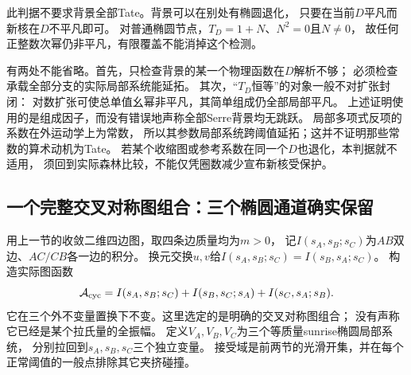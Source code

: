 \documentclass[11pt,a4paper]{ctexart}
\theoremstyle{cnplain}\newtheorem{theorem}{定理}[section]
\theoremstyle{definition}\newtheorem{definition}[theorem]{定义}
\theoremstyle{remark}\newtheorem{remark}[theorem]{注}
\begin{document}
此判据不要求背景全部Tate。背景可以在别处有椭圆退化，
只要在当前$D$平凡而新核在$D$不平凡即可。
对普通椭圆节点，$T_D=1+N$、$N^2=0$且$N\ne0$，
故任何正整数次幂仍非平凡，有限覆盖不能消掉这个检测。

有两处不能省略。首先，只检查背景的某一个物理函数在$D$解析不够；
必须检查承载全部分支的实际局部系统能延拓。
其次，“$T_D$恒等”的对象一般不对扩张封闭：
对数扩张可使总单值幺幂非平凡，其简单组成仍全部局部平凡。
上述证明使用的是组成因子，而没有错误地声称全部Serre背景均无跳跃。
局部多项式反项的系数在外运动学上为常数，
所以其参数局部系统跨阈值延拓；这并不证明那些常数的算术动机为Tate。
若某个收缩图或参考系数在同一个$D$也退化，本判据就不适用，
须回到实际森林比较，不能仅凭圈数减少宣布新核受保护。

\subsection{一个完整交叉对称图组合：三个椭圆通道确实保留}
用上一节的收敛二维四边图，取四条边质量均为$m>0$，
记$I(s_A,s_B;s_C)$为$AB$双边、$AC/CB$各一边的积分。
换元交换$u,v$给$I(s_A,s_B;s_C)=I(s_B,s_A;s_C)$。
构造实际图函数
\begin{equation}\label{eq:cyclicice}
 \mathcal A_{\rm cyc}
 =I(s_A,s_B;s_C)+I(s_B,s_C;s_A)+I(s_C,s_A;s_B).
\end{equation}
它在三个外不变量置换下不变。这里选定的是明确的交叉对称图组合；
没有声称它已经是某个拉氏量的全振幅。
定义$V_A,V_B,V_C$为三个等质量sunrise椭圆局部系统，
分别拉回到$s_A,s_B,s_C$三个独立变量。
接受域是前两节的光滑开集，并在每个正常阈值的一般点排除其它夹挤碰撞。
\end{document}
